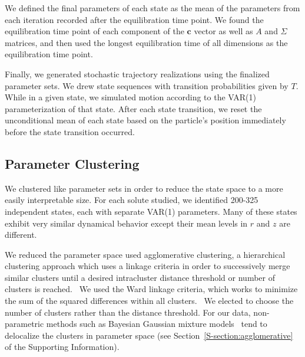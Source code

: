 \documentclass[journal=jpcbfk,manuscript=article]{achemso}
\begin{document}
  We defined the final parameters of each state as the mean of the parameters 
  from each iteration recorded after the equilibration time point. We found the 
  equilibration time point of each component of the $\mathbf{c}$ vector as well as 
  $A$ and $\Sigma$ matrices, and then used the longest equilibration time of all 
  dimensions as the equilibration time point. 
  
  Finally, we generated stochastic trajectory realizations using the finalized
  parameter sets. We drew state sequences with transition probabilities given by
  $T$. While in a given state, we simulated motion according to the VAR(1)
  parameterization of that state. After each state transition, we reset the 
  unconditional mean of each state based on the particle's position immediately
  before the state transition occurred.
  
  \subsection{Parameter Clustering}\label{method:clustering}  

  We clustered like parameter sets in order to reduce the state space to
  a more easily interpretable size. For each solute studied, we identified 200-325
  independent states, each with separate VAR(1) parameters. Many of these states
  exhibit very similar dynamical behavior except their mean levels in $r$ and $z$
  are different.
  
  We reduced the parameter space used agglomerative clustering, a hierarchical
  clustering approach which uses a linkage criteria in order to successively merge
  similar clusters until a desired intracluster distance threshold or number of
  clusters is reached.~\cite{pedregosa_scikit-learn_2011} We used the Ward linkage 
  criteria, which works to minimize the sum of the squared differences within all
  clusters.~\cite{ward_hierarchical_1963} We elected to choose the number of clusters
  rather than the distance threshold. For our data, non-parametric methods such as 
  Bayesian Gaussian mixture models~\cite{pedregosa_scikit-learn_2011,gelman_bayesian_2013}
  tend to delocalize the clusters in parameter space (see Section~\ref{S-section:agglomerative}
  of the Supporting Information).
\end{document}
